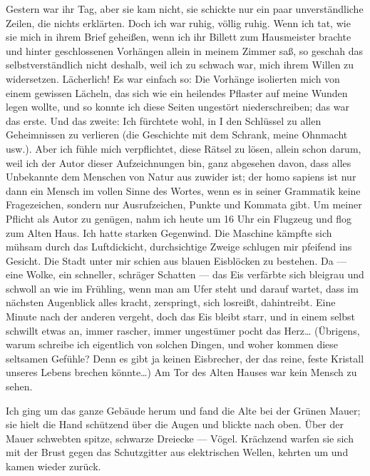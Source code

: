 Gestern war ihr Tag, aber sie kam nicht, sie schickte nur ein paar
unverständliche Zeilen, die nichts erklärten. Doch ich war ruhig,
völlig ruhig. Wenn ich tat, wie sie mich in ihrem Brief geheißen,
wenn ich ihr Billett zum Hausmeister brachte und hinter
geschlossenen Vorhängen allein in meinem Zimmer saß, so geschah das
selbstverständlich nicht deshalb, weil ich zu schwach war, mich
ihrem Willen zu widersetzen. Lächerlich! Es war einfach so: Die
Vorhänge isolierten mich von einem gewissen Lächeln, das sich wie
ein heilendes Pflaster auf meine Wunden legen wollte, und so konnte
ich diese Seiten ungestört niederschreiben; das war das erste. Und
das zweite: Ich fürchtete wohl, in I den Schlüssel zu allen
Geheimnissen zu verlieren (die Geschichte mit dem Schrank, meine
Ohnmacht usw.). Aber ich fühle mich verpflichtet, diese Rätsel zu
lösen, allein schon darum, weil ich der Autor dieser Aufzeichnungen
bin, ganz abgesehen davon, dass alles Unbekannte dem Menschen von
Natur aus zuwider ist; der homo sapiens ist nur dann ein Mensch im
vollen Sinne des Wortes, wenn es in seiner Grammatik keine
Fragezeichen, sondern nur Ausrufzeichen, Punkte und Kommata gibt.
Um meiner Pflicht als Autor zu genügen, nahm ich heute um 16 Uhr
ein Flugzeug und flog zum Alten Haus. Ich hatte starken Gegenwind.
Die Maschine kämpfte sich mühsam durch das Luftdickicht,
durchsichtige Zweige schlugen mir pfeifend ins Gesicht. Die Stadt
unter mir schien aus blauen Eisblöcken zu bestehen. Da — eine
Wolke, ein schneller, schräger Schatten — das Eis verfärbte sich
bleigrau und schwoll an wie im Frühling, wenn man am Ufer steht und
darauf wartet, dass im nächsten Augenblick alles kracht,
zerspringt, sich losreißt, dahintreibt. Eine Minute nach der
anderen vergeht, doch das Eis bleibt starr, und in einem selbst
schwillt etwas an, immer rascher, immer ungestümer pocht das
Herz\ldots{} (Übrigens, warum schreibe ich eigentlich von solchen
Dingen, und woher kommen diese seltsamen Gefühle? Denn es gibt ja
keinen Eisbrecher, der das reine, feste Kristall unseres Lebens
brechen könnte\ldots{}) Am Tor des Alten Hauses war kein Mensch zu
sehen.

Ich ging um das ganze Gebäude herum und fand die Alte bei der
Grünen Mauer; sie hielt die Hand schützend über die Augen und
blickte nach oben. Über der Mauer schwebten spitze, schwarze
Dreiecke — Vögel. Krächzend warfen sie sich mit der Brust gegen das
Schutzgitter aus elektrischen Wellen, kehrten um und kamen wieder
zurück.

